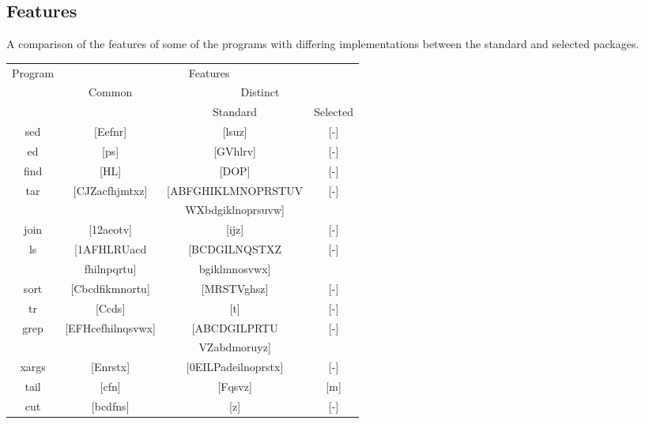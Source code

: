 \subsection{Features}\label{Features}

A comparison of the features of some of the programs with differing implementations between the standard and selected packages.

\begin{table}[H]
    \begin{center}
        \begin{tabular}{|c|c|c|c|}
            \hline
            \multirow{3}{*}{Program} & \multicolumn{3}{|c|}{Features} \\
            \cline{2-4}
            & \multirow{2}{*}{Common} & \multicolumn{2}{|c|}{Distinct} \\
            \cline{3-4}
            & & Standard & Selected \\
            \hline
            \hline
            sed & [Eefnr] & [lsuz] & [-] \\
            \hline
            ed & [ps] & [GVhlrv] & [-] \\
            \hline
            find & [HL] & [DOP] & [-] \\
            \hline
            \multirow{2}{*}{tar} & \multirow{2}{*}{[CJZacfhjmtxz]} & [ABFGHIKLMNOPRSTUV & \multirow{2}{*}{[-]} \\
            & & WXbdgiklnoprsuvw] & \\
            \hline
            join & [12aeotv] & [ijz] & [-] \\
            \hline
            \multirow{2}{*}{ls} & [1AFHLRUacd & [BCDGILNQSTXZ & \multirow{2}{*}{[-]} \\
            & fhilnpqrtu] & bgiklmnosvwx] & \\
            \hline
            sort & [Cbcdfikmnortu] & [MRSTVghsz] & [-] \\
            \hline
            tr & [Ccds] & [t] & [-] \\
            \hline
            \multirow{2}{*}{grep} & \multirow{2}{*}{[EFHcefhilnqsvwx]} & [ABCDGILPRTU & \multirow{2}{*}{[-]} \\
            & & VZabdmoruyz] & \\
            \hline
            xargs & [Enrstx] & [0EILPadeilnoprstx] & [-] \\
            \hline
            tail & [cfn] & [Fqsvz] & [m] \\
            \hline
            cut & [bcdfns] & [z] & [-] \\

\end{tabular}
\end{center}
\end{table}
